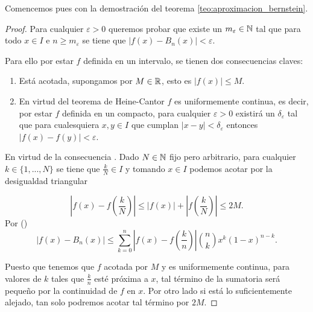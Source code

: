 Comencemos pues con la demostración del teorema \ref{teo:aproximacion_bernstein}.
\begin{proof}
    
    Para cualquier $\varepsilon > 0$ queremos probar que existe un $m_\varepsilon  \in \mathbb{N}$ tal que para 
    todo $x \in I$ e $n \geq m_\varepsilon$  se tiene que 
    $|f(x) - B_n(x)| < \varepsilon$.
    
     Para ello por estar $f$ definida en un intervalo, 
    se tienen dos consecuencias claves: 
    \begin{enumerate}
        \item Está acotada, supongamos por $M \in \mathbb{R}$, esto es $|f(x)| \leq M$. \label{consecuencia:M}
        \item En virtud del teorema de Heine-Cantor $f$ es uniformemente continua, es decir, por estar $f$ definida en un compacto,  para cualquier $\varepsilon >0$ existirá un $\delta_\varepsilon$
        tal que para cualesquiera $x,y \in I$ que cumplan $|x-y| < \delta_\varepsilon$ entonces $|f(x)-f(y)| < \varepsilon$. \label{consecuencia:delta}
    \end{enumerate}
    En virtud de la consecuencia . 
    Dado $N \in  \mathbb{N}$ fijo pero arbitrario, para cualquier $k \in \{1, ..., N\}$ se tiene que
    $\frac{k}{N} \in I$ y tomando $x \in I$ podemos acotar por la desigualdad triangular

    $$\left|f(x)- f\left( \frac{k}{N} \right) \right| \leq |f(x)| + \left|f \left( \frac{k}{N}\right) \right|\leq 2M.$$  
    Por () 
    \begin{equation*}
        |f(x)-B_n(x)| 
        \leq
        \sum_{k=0}^n \left|f(x) - f \left( \frac{k}{n} \right)\right| 
     \binom{n}{k} x^{k} (1-x)^{n-k}.
    \end{equation*}

    Puesto que tenemos que $f$ acotada por $M$ y es uniformemente continua, para valores de $k$ tales que $\frac{k}{n}$ 
    esté próxima a $x$, tal término de la sumatoria será pequeño por la continuidad de $f$ en $x$. Por otro lado
    si está lo suficientemente alejado, tan solo podremos acotar tal término por $2M$.  


\end{proof}
